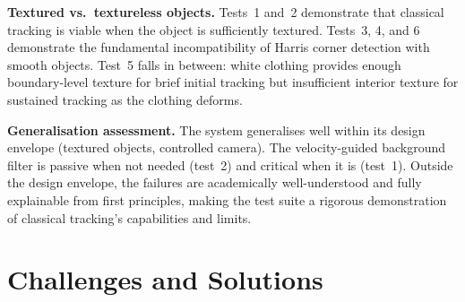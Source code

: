 \documentclass[12pt,a4paper]{article}
\begin{document}
\textbf{Textured vs.\ textureless objects.} Tests~1 and~2 demonstrate that classical tracking
is viable when the object is sufficiently textured. Tests~3, 4, and 6 demonstrate the
fundamental incompatibility of Harris corner detection with smooth objects. Test~5 falls
in between: white clothing provides enough boundary-level texture for brief initial tracking
but insufficient interior texture for sustained tracking as the clothing deforms.

\textbf{Generalisation assessment.} The system generalises well within its design envelope
(textured objects, controlled camera). The velocity-guided background filter is passive when
not needed (test~2) and critical when it is (test~1). Outside the design envelope, the failures
are academically well-understood and fully explainable from first principles, making the test
suite a rigorous demonstration of classical tracking's capabilities and limits.

\section{Challenges and Solutions}
\end{document}
